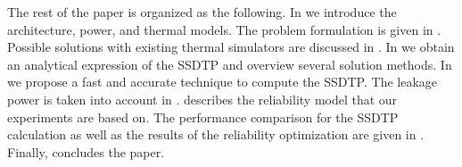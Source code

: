 The rest of the paper is organized as the following. In  we introduce the architecture, power, and thermal models. The problem formulation is given in . Possible solutions with existing thermal simulators are discussed in . In  we obtain an analytical expression of the SSDTP and overview several solution methods. In  we propose a fast and accurate technique to compute the SSDTP. The leakage power is taken into account in .  describes the reliability model that our experiments are based on. The performance comparison for the SSDTP calculation as well as the results of the reliability optimization are given in . Finally,  concludes the paper.
